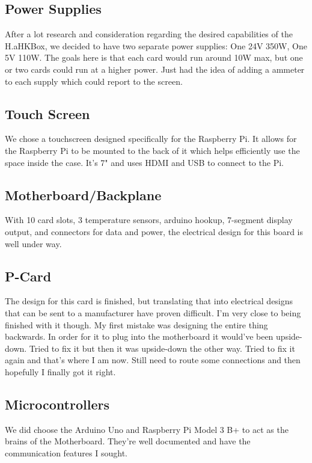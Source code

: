 \documentclass[prb,preprint]{revtex4-1}
\begin{document}
\subsection{Power Supplies}
After a lot research and consideration regarding the desired capabilities of the H.aHKBox, we decided to have two separate power supplies: One 24V 350W, One 5V 110W. The goals here is that each card would run around 10W max, but one or two cards could run at a higher power. Just had the idea of adding a ammeter to each supply which could report to the screen.

\subsection{Touch Screen}
We chose a touchscreen designed specifically for the Raspberry Pi. It allows for the Raspberry Pi to be mounted to the back of it which helps efficiently use the space inside the case. It's 7" and uses HDMI and USB to connect to the Pi.

\subsection{Motherboard/Backplane}
With 10 card slots, 3 temperature sensors, arduino hookup, 7-segment display output, and connectors for data and power, the electrical design for this board is well under way.

\subsection{P-Card}
The design for this card is finished, but translating that into electrical designs that can be sent to a manufacturer have proven difficult. I'm very close to being finished with it though. My first mistake was designing the entire thing backwards. In order for it to plug into the motherboard it would've been upside-down. Tried to fix it but then it was upside-down the other way. Tried to fix it again and that's where I am now. Still need to route some connections and then hopefully I finally got it right.

\subsection{Microcontrollers}
We did choose the Arduino Uno and Raspberry Pi Model 3 B+ to act as the brains of the Motherboard. They're well documented and have the communication features I sought.
\end{document}
